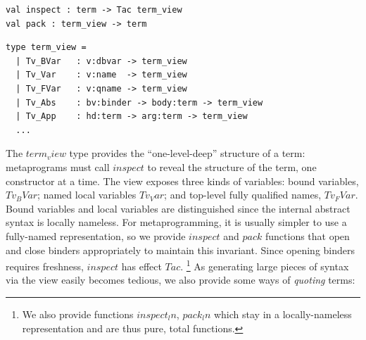 \documentclass[runningheads]{llncs}
\newcommand\fstar{F$^\star$\xspace}
\newcommand{\comm}[3]{\ifcheckpagebudget\else\ifdraft{{\color{#1}[#2: #3]}}\fi\fi}
\newcommand{\nik}[1]{\comm{dkpurple}{Nik}{#1}}
\newcommand{\guido}[1]{\comm{blue}{Guido}{#1}}
\begin{document}
\vspace{-5mm}
\noindent
\begin{minipage}[t]{.42\textwidth}
\begin{lstlisting}
val inspect : term -> Tac term_view
val pack : term_view -> term
\end{lstlisting}
\end{minipage}
\begin{minipage}[t]{.58\textwidth}
\begin{lstlisting}
type term_view =
  | Tv_BVar   : v:dbvar -> term_view
  | Tv_Var    : v:name  -> term_view
  | Tv_FVar   : v:qname -> term_view
  | Tv_Abs    : bv:binder -> body:term -> term_view
  | Tv_App    : hd:term -> arg:term -> term_view
  ...
\end{lstlisting}
\end{minipage}
%
%
%
The \ls$term_view$ type provides the ``one-level-deep'' structure of a
term: metaprograms must call \ls$inspect$ to reveal the structure of the
term, one constructor at a time.
%
The view exposes three kinds of variables: bound variables, \ls$Tv_BVar$;
named local variables \ls$Tv_Var$; and top-level fully qualified names,
\ls$Tv_FVar$.
%
Bound variables and local variables are distinguished since the internal
abstract syntax is locally nameless.
%
For metaprogramming, it is usually simpler to use a fully-named
representation, so we provide \ls$inspect$ and \ls$pack$ functions
that open and close binders appropriately to maintain this invariant.
%
Since opening binders requires freshness, \ls$inspect$ has effect \ls$Tac$.%
\footnote{We also provide functions \ls$inspect_ln$, \ls$pack_ln$
which stay in a locally-nameless representation and are thus pure, total
functions.}
%
As generating large pieces of syntax via the view easily becomes
tedious, we also provide some ways of \emph{quoting} terms:

\iffalse
\end{document}
